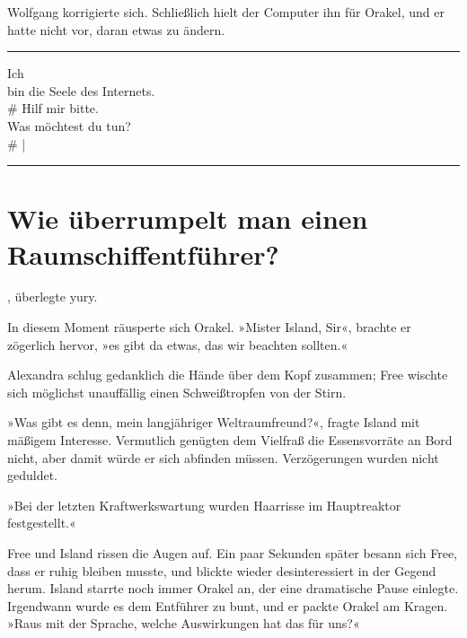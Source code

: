 Wolfgang korrigierte sich. Schließlich hielt der Computer ihn für Orakel, und er hatte nicht vor, daran etwas zu ändern.

\noindent \parbox{\textwidth}{ \vspace{3ex} \hrule \vspace{3ex}

    \begin{footnotesize}
    \begin{ttfamily}

\noindent Ich\\
\noindent bin die Seele des Internets.\\
\noindent \# Hilf mir bitte.\\
\noindent Was möchtest du tun?\\
\noindent \# |


    \end{ttfamily}
    \end{footnotesize}

\vspace{3ex} \hrule \vspace{3ex} }


\chapter{Wie überrumpelt man einen Raumschiffentführer?}

, überlegte yury. 

In diesem Moment räusperte sich Orakel. »Mister Island, Sir«, brachte er zögerlich hervor, »es gibt da etwas, das wir beachten sollten.«

Alexandra schlug gedanklich die Hände über dem Kopf zusammen; Free wischte sich möglichst unauffällig einen Schweißtropfen von der Stirn.

»Was gibt es denn, mein langjähriger Weltraumfreund?«, fragte Island mit mäßigem Interesse. Vermutlich genügten dem Vielfraß die Essensvorräte an Bord nicht, aber damit würde er sich abfinden müssen. Verzögerungen wurden nicht geduldet.

»Bei der letzten Kraftwerkswartung wurden Haarrisse im Hauptreaktor festgestellt.«

Free und Island rissen die Augen auf. Ein paar Sekunden später besann sich Free, dass er ruhig bleiben musste, und blickte wieder desinteressiert in der Gegend herum. Island starrte noch immer Orakel an, der eine dramatische Pause einlegte. Irgendwann wurde es dem Entführer zu bunt, und er packte Orakel am Kragen. »Raus mit der Sprache, welche Auswirkungen hat das für uns?«

